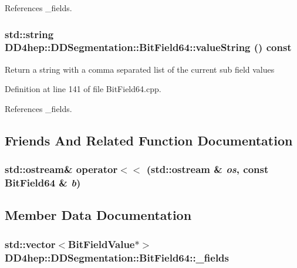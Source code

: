 References \_\-fields.\hypertarget{class_d_d4hep_1_1_d_d_segmentation_1_1_bit_field64_a12b1d9c2421cd65cc4d2fc1d390b5b4e}{
\subsubsection[{valueString}]{\setlength{\rightskip}{0pt plus 5cm}std::string DD4hep::DDSegmentation::BitField64::valueString () const}}
\label{class_d_d4hep_1_1_d_d_segmentation_1_1_bit_field64_a12b1d9c2421cd65cc4d2fc1d390b5b4e}
Return a string with a comma separated list of the current sub field values 

Definition at line 141 of file BitField64.cpp.

References \_\-fields.

\subsection{Friends And Related Function Documentation}
\hypertarget{class_d_d4hep_1_1_d_d_segmentation_1_1_bit_field64_a6d781e0764c4c38ae618a3431af85e4e}{
\subsubsection[{operator$<$$<$}]{\setlength{\rightskip}{0pt plus 5cm}std::ostream\& operator$<$$<$ (std::ostream \& {\em os}, \/  const {\bf BitField64} \& {\em b})}}
\label{class_d_d4hep_1_1_d_d_segmentation_1_1_bit_field64_a6d781e0764c4c38ae618a3431af85e4e}


\subsection{Member Data Documentation}
\hypertarget{class_d_d4hep_1_1_d_d_segmentation_1_1_bit_field64_a1a8739ee82ff112b34aee61feb39cda3}{
\subsubsection[{\_\-fields}]{\setlength{\rightskip}{0pt plus 5cm}std::vector$<${\bf BitFieldValue}$\ast$$>$ {\bf DD4hep::DDSegmentation::BitField64::\_\-fields}}}
\label{class_d_d4hep_1_1_d_d_segmentation_1_1_bit_field64_a1a8739ee82ff112b34aee61feb39cda3}


